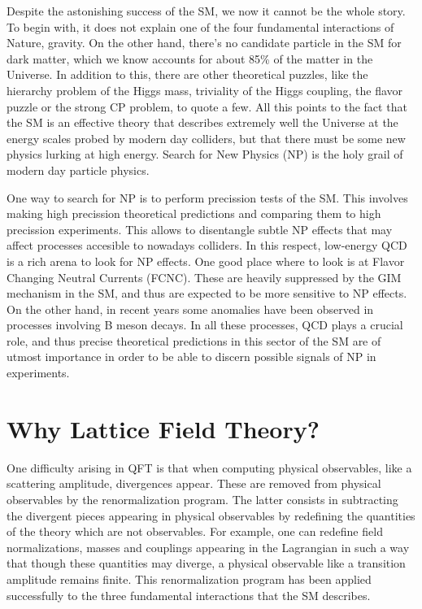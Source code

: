 Despite the astonishing success of the SM, we now it cannot be the whole story. To begin with, it does not explain one of the four fundamental interactions of Nature, gravity. On the other hand, there's no candidate particle in the SM for dark matter, which we know accounts for about 85\% of the matter in the Universe. In addition to this, there are other theoretical puzzles, like the hierarchy problem of the Higgs mass, triviality of the Higgs coupling, the flavor puzzle or the strong CP problem, to quote a few. All this points to the fact that the SM is an effective theory that describes extremely well the Universe at the energy scales probed by modern day colliders, but that there must be some new physics lurking at high energy. Search for New Physics (NP) is the holy grail of modern day particle physics. 

One way to search for NP is to perform precission tests of the SM. This involves making high precission theoretical predictions and comparing them to high precission experiments. This allows to disentangle subtle NP effects that may affect processes accesible to nowadays colliders. In this respect, low-energy QCD is a rich arena to look for NP effects. One good place where to look is at Flavor Changing Neutral Currents (FCNC). These are heavily suppressed by the GIM mechanism in the SM, and thus are expected to be more sensitive to NP effects. On the other hand, in recent years some anomalies have been observed in processes involving B meson decays. In all these processes, QCD plays a crucial role, and thus precise theoretical predictions in this sector of the SM are of utmost importance in order to be able to discern possible signals of NP in experiments. 

\section{Why Lattice Field Theory?}

One difficulty arising in QFT is that when computing physical observables, like a scattering amplitude, divergences appear. These are removed from physical observables by the renormalization program. The latter consists in subtracting the divergent pieces appearing in physical observables by redefining the quantities of the theory which are not observables. For example, one can redefine field normalizations, masses and couplings appearing in the Lagrangian in such a way that though these quantities may diverge, a physical observable like a transition amplitude remains finite. This renormalization program has been applied successfully to the three fundamental interactions that the SM describes.

